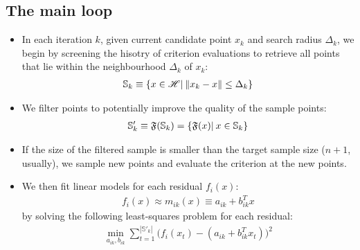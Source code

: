 \subsection{The main loop}
\begin{itemize}
    \item In each iteration $k$, given current candidate point $x_k$ and search radius $\Delta_k$, we begin by screening the hisotry of criterion evaluations to retrieve all points that lie within the neighbourhood $\Delta_k$ of $x_k$:
            \begin{align}
                \mathbb{S}_k\equiv\{x\in\mathscr{H}|\hspace{0.2em}\lVert x_k-x\rVert\leq\Delta_k\}
                \label{eq:hist-search}
            \end{align}
        \item We filter points to potentially improve the quality of the sample points:
            \begin{align}
                \mathbb{S}'_k\equiv\mathfrak{F}(\mathbb{S}_k) = \{\mathfrak{F}(x)|\hspace{0.2em} x\in \mathbb{S}_k\}
                \label{eq:filtering}
            \end{align}
        \item If the size of the filtered sample is smaller than the target sample size ($n+1$, usually), we sample new points and evaluate the criterion at the new points.
    \item We then fit linear models for each residual $f_i(x)$:
            \begin{align}
                f_i(x)\approx m_{ik}(x) \equiv a_{ik}+b_{ik}^Tx
                \label{eq:model-linear}
            \end{align}
    by solving the following least-squares problem for each residual:
            \begin{align}
                \min\limits_{a_{ik},b_{ik}}\sum\limits_{t=1}^{|\mathbb{S}'_k|}\big(f_i(x_t)-(a_{ik}+b_{ik}^Tx_t)\big)^2
                \label{eq:fit-linear}
            \end{align}


\end{itemize}

